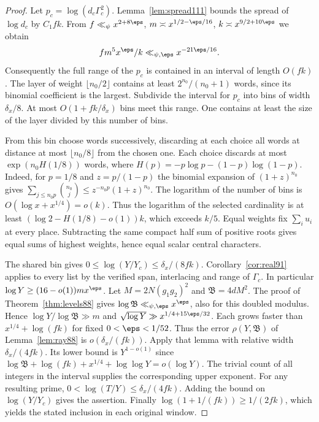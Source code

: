 \documentclass[a4paper,11pt]{article}
\theoremstyle{definition}
\theoremstyle{remark}
\numberwithin{equation}{section}
\begin{document}
\begin{proof}
Let \(p_c=\log(d_c\Gamma_c^2)\).
Lemma~\ref{lem:spread111} bounds the spread of \(\log d_c\)
by \(C_1fk\). From \(f\ll_\psi x^{2+8\eps}\),
\(m\asymp x^{1/2-\eps/16}\), \(k\asymp x^{9/2+10\eps}\) we
obtain
\[
            f m^5 x^\eps/k\ll_{\psi,\eps} x^{-21\eps/16}.
\]
Consequently the full range of the \(p_c\) is contained in
an interval of length \(O(fk)\). The layer of weight
\(\lfloor n_0/2\rfloor\) contains at least \(2^{n_0}/(n_0+1)\)
words, since its binomial coefficient is the largest. Subdivide
the interval for \(p_c\) into bins of width \(\delta_x/8\).
At most \(O(1+fk/\delta_x)\) bins meet this range.
One contains at least the size of the layer divided by this
number of bins.

From this bin choose words successively, discarding at each
choice all words at distance at most \(\lfloor n_0/8\rfloor\)
from the chosen one. Each choice discards at most
\(\exp(n_0 H(1/8))\) words, where
\(H(p)=-p\log p-(1-p)\log(1-p)\). Indeed, for \(p=1/8\)
and \(z=p/(1-p)\) the binomial expansion of \((1+z)^{n_0}\)
gives
\(\sum_{j\le n_0p}\binom{n_0}{j}\le z^{-n_0p}(1+z)^{n_0}\).
The logarithm of the number of bins is \(O(\log x+x^{1/4})=o(k)\).
Thus the logarithm of the selected cardinality is at least
\((\log 2-H(1/8)-o(1))k\), which exceeds \(k/5\).
Equal weights fix \(\sum_i u_i\) at every place. Subtracting
the same compact half sum of positive roots gives equal sums of
highest weights, hence equal scalar central characters.

The shared bin gives \(0\le\log(Y/Y_c)\le\delta_x/(8fk)\).
Corollary~\ref{cor:real91} applies to every list by the verified
span, interlacing and range of \(\Gamma_c\). In particular
\(\log Y\ge(16-o(1))m x^\eps\). Let \(M=2N(g_1g_2)^2\) and
\(\mathfrak B=4dM^2\). The proof of Theorem~\ref{thm:levels88}
gives \(\log\mathfrak B\ll_{\psi,\eps}x^\eps\), also for this
doubled modulus. Hence \(\log Y/\log\mathfrak B\gg m\) and
\(\sqrt{\log Y}\gg x^{1/4+15\eps/32}\). Each grows faster than
\(x^{1/4}+\log(fk)\) for fixed \(0<\eps<1/52\).
Thus the error \(\rho(Y,\mathfrak B)\) of Lemma~\ref{lem:ray88}
is \(o(\delta_x/(fk))\). Apply that lemma with relative width
\(\delta_x/(4fk)\). Its lower bound is \(Y^{1-o(1)}\) since
\(\log\mathfrak B+\log(fk)+x^{1/4}+\log\log Y=o(\log Y)\).
The trivial count of all integers in the interval supplies the
corresponding upper exponent. For any resulting prime,
\(0<\log(T/Y)\le\delta_x/(4fk)\). Adding the bound
on \(\log(Y/Y_c)\) gives the assertion. Finally
\(\log(1+1/(fk))\ge1/(2fk)\), which yields the stated
inclusion in each original window.
\end{proof}
\end{document}
